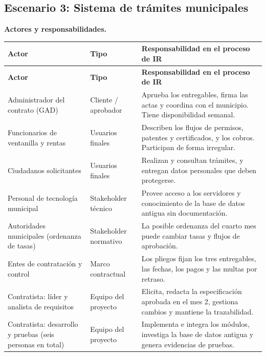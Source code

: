 \subsection{Escenario 3: Sistema de trámites municipales}

\textbf{Actores y responsabilidades.}

{\small
\setlength{\tabcolsep}{4pt}
\renewcommand{\arraystretch}{1.3}
\begin{longtable}{
|>{\raggedright\arraybackslash}p{}
|>{\raggedright\arraybackslash}p{}
|>{\raggedright\arraybackslash}p{}|}
\hline
\textbf{Actor} & \textbf{Tipo} & \textbf{Responsabilidad en el proceso de IR} \\
\hline
\endfirsthead
\hline
\textbf{Actor} & \textbf{Tipo} & \textbf{Responsabilidad en el proceso de IR} \\
\hline
\endhead
Administrador del contrato (GAD) & Cliente / aprobador & Aprueba los entregables, firma las actas y coordina con el municipio. Tiene disponibilidad semanal. \\
\hline
Funcionarios de ventanilla y rentas & Usuarios finales & Describen los flujos de permisos, patentes y certificados, y los cobros. Participan de forma irregular. \\
\hline
Ciudadanos solicitantes & Usuarios finales & Realizan y consultan trámites, y entregan datos personales que deben protegerse. \\
\hline
Personal de tecnología municipal & Stakeholder técnico & Provee acceso a los servidores y conocimiento de la base de datos antigua sin documentación. \\
\hline
Autoridades municipales (ordenanza de tasas) & Stakeholder normativo & La posible ordenanza del cuarto mes puede cambiar tasas y flujos de aprobación. \\
\hline
Entes de contratación y control & Marco contractual & Los pliegos fijan los tres entregables, las fechas, los pagos y las multas por retraso. \\
\hline
Contratista: líder y analista de requisitos & Equipo del proyecto & Elicita, redacta la especificación aprobada en el mes 2, gestiona cambios y mantiene la trazabilidad. \\
\hline
Contratista: desarrollo y pruebas (seis personas en total) & Equipo del proyecto & Implementa e integra los módulos, investiga la base de datos antigua y genera evidencias de pruebas. \\
\hline
\end{longtable}
}

